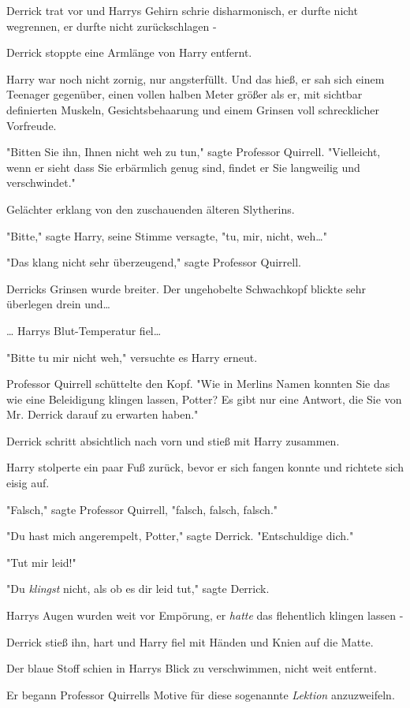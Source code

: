 {Derrick trat vor und Harrys Gehirn schrie disharmonisch, er durfte nicht wegrennen, er durfte nicht zurückschlagen -

Derrick stoppte eine Armlänge von Harry entfernt.

Harry war noch nicht zornig, nur angsterfüllt. Und das hieß, er sah sich einem Teenager gegenüber, einen vollen halben Meter größer als er, mit sichtbar definierten Muskeln, Gesichtsbehaarung und einem Grinsen voll schrecklicher Vorfreude.

"Bitten Sie ihn, Ihnen nicht weh zu tun," sagte Professor Quirrell. "Vielleicht, wenn er sieht dass Sie erbärmlich genug sind, findet er Sie langweilig und verschwindet."

Gelächter erklang von den zuschauenden älteren Slytherins.

"Bitte," sagte Harry, seine Stimme versagte, "tu, mir, nicht, weh…"

"Das klang nicht sehr überzeugend," sagte Professor Quirrell.

Derricks Grinsen wurde breiter. Der ungehobelte Schwachkopf blickte sehr überlegen drein und…

… Harrys Blut-Temperatur fiel…

"Bitte tu mir nicht weh," versuchte es Harry erneut.

Professor Quirrell schüttelte den Kopf. "Wie in Merlins Namen konnten Sie das wie eine Beleidigung klingen lassen, Potter? Es gibt nur eine Antwort, die Sie von Mr. Derrick darauf zu erwarten haben."

Derrick schritt absichtlich nach vorn und stieß mit Harry zusammen.

Harry stolperte ein paar Fuß zurück, bevor er sich fangen konnte und richtete sich eisig auf.

"Falsch," sagte Professor Quirrell, "falsch, falsch, falsch."

"Du hast mich angerempelt, Potter," sagte Derrick. "Entschuldige dich."

"Tut mir leid!"

"Du \emph{klingst} nicht, als ob es dir leid tut," sagte Derrick.

Harrys Augen wurden weit vor Empörung, er \emph{hatte} das flehentlich klingen lassen -

Derrick stieß ihn, hart und Harry fiel mit Händen und Knien auf die Matte.

Der blaue Stoff schien in Harrys Blick zu verschwimmen, nicht weit entfernt.

Er begann Professor Quirrells Motive für diese sogenannte \emph{Lektion} anzuzweifeln.

}
